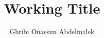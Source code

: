 \documentclass[a4paper]{memoir}
\title{Working Title}
\author{Ghribi Ouassim Abdelmalek}
\begin{document}
\begin{titlingpage}
    \maketitle
\end{titlingpage}


\end{document}
